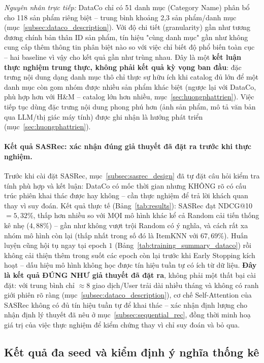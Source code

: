 \textit{Nguyên nhân trực tiếp:} DataCo chỉ có 51 danh mục (Category Name) phân bổ cho 118 sản phẩm riêng biệt -- trung bình khoảng 2,3 sản phẩm/danh mục (mục~\ref{subsec:dataco_description}). Với độ chi tiết (granularity) gần như tương đương chính bản thân ID sản phẩm, tín hiệu "cùng danh mục" gần như không cung cấp thêm thông tin phân biệt nào so với việc chỉ biết độ phổ biến toàn cục -- hai baseline vì vậy cho kết quả gần như trùng nhau. Đây là một \textbf{kết luận thực nghiệm trung thực, không phải kết quả kỳ vọng ban đầu}: đặc trưng nội dung dạng danh mục thô chỉ thực sự hữu ích khi catalog đủ lớn để một danh mục còn gom nhóm được nhiều sản phẩm khác biệt (ngược lại với DataCo, phù hợp hơn với H\&M -- catalog lớn hơn nhiều, mục~\ref{sec:huongphattrien}). Việc tiếp tục dùng đặc trưng nội dung phong phú hơn (ảnh sản phẩm, mô tả văn bản qua LLM/thị giác máy tính) được ghi nhận là hướng phát triển (mục~\ref{sec:huongphattrien}).

\paragraph{Kết quả SASRec: xác nhận đúng giả thuyết đã đặt ra trước khi thực nghiệm.} Trước khi cài đặt SASRec, mục~\ref{subsec:sasrec_design} đã tự đặt câu hỏi kiểm tra tính phù hợp và kết luận: DataCo có mốc thời gian nhưng KHÔNG rõ có cấu trúc phiên khai thác được hay không -- cần thực nghiệm để trả lời khách quan thay vì suy đoán. Kết quả thực tế (Bảng~\ref{tab:results}): SASRec đạt NDCG@10 $=5{,}32\%$, thấp hơn nhiều so với MỌI mô hình khác kể cả Random cải tiến thống kê nhẹ ($4{,}88\%$) -- gần như không vượt trội Random có ý nghĩa, và cách rất xa nhóm mô hình còn lại (thấp nhất trong số đó là ItemKNN với $67{,}69\%$). Huấn luyện cũng hội tụ ngay tại epoch $1$ (Bảng~\ref{tab:training_summary_dataco}) rồi không cải thiện thêm trong suốt các epoch còn lại trước khi Early Stopping kích hoạt -- dấu hiệu mô hình không học được tín hiệu tuần tự có ích từ dữ liệu. \textbf{Đây là kết quả ĐÚNG NHƯ giả thuyết đã đặt ra}, không phải một thất bại cài đặt: với trung bình chỉ $\approx 8$ giao dịch/User trải dài nhiều tháng và không có ranh giới phiên rõ ràng (mục~\ref{subsec:dataco_description}), cơ chế Self-Attention của SASRec không có đủ tín hiệu tuần tự để khai thác -- xác nhận định lượng cho nhận định lý thuyết đã nêu ở mục~\ref{subsec:sequential_rec}, đồng thời minh hoạ giá trị của việc thực nghiệm để kiểm chứng thay vì chỉ suy đoán và bỏ qua.

\subsection{Kết quả đa seed và kiểm định ý nghĩa thống kê}
\label{subsec:multiseed_results}

